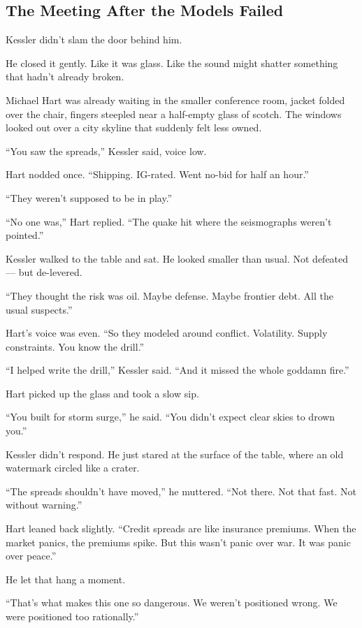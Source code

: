 
\subsection{The Meeting After the Models Failed}

Kessler didn’t slam the door behind him.

He closed it gently. Like it was glass. Like the sound might shatter something that hadn’t already broken.

Michael Hart was already waiting in the smaller conference room, jacket folded over the chair, fingers steepled near a half-empty glass of scotch. The windows looked out over a city skyline that suddenly felt less owned.

“You saw the spreads,” Kessler said, voice low.

Hart nodded once. “Shipping. IG-rated. Went no-bid for half an hour.”

“They weren’t supposed to be in play.”

“No one was,” Hart replied. “The quake hit where the seismographs weren’t pointed.”

Kessler walked to the table and sat. He looked smaller than usual. Not defeated — but de-levered.

“They thought the risk was oil. Maybe defense. Maybe frontier debt. All the usual suspects.”

Hart’s voice was even. “So they modeled around conflict. Volatility. Supply constraints. You know the drill.”

“I helped write the drill,” Kessler said. “And it missed the whole goddamn fire.”

Hart picked up the glass and took a slow sip.

“You built for storm surge,” he said. “You didn’t expect clear skies to drown you.”

Kessler didn’t respond. He just stared at the surface of the table, where an old watermark circled like a crater.

“The spreads shouldn’t have moved,” he muttered. “Not there. Not that fast. Not without warning.”

Hart leaned back slightly. “Credit spreads are like insurance premiums. When the market panics, the premiums spike. But this wasn’t panic over war. It was panic over peace.”

He let that hang a moment.

“That’s what makes this one so dangerous. We weren’t positioned wrong. We were positioned too rationally.”

